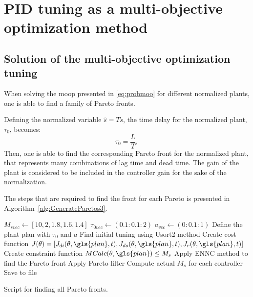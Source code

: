\chapter{PID tuning as a multi-objective optimization method}
\label{chap:PIDMOOP}

\section{Solution of the multi-objective optimization tuning}
\label{sec:SolMOOP}
When solving the \gls{moop} presented in \eqref{eq:probmoo} for different normalized plants, one is able to find a family of Pareto fronts.

Defining the normalized variable $\hat{s}=T s$, the time delay for the normalized plant, $\tau_0$, becomes:
\begin{equation}
\tau_0 = \frac{L}{T},
\label{eq:tauNorm}
\end{equation}
%
Then, one is able to find the corresponding Pareto front for the normalized plant, that represents many combinations of lag time and dead time. The gain of the plant is considered to be included in the controller gain for the sake of the normalization.

The steps that are required to find the front for each Pareto is presented in Algorithm~\ref{alg:GenerateParetos3}.
%
\begin{algorithm}[tb]
	\begin{algorithmic}
		\State $M_{svec} \gets [10,2,1.8,1.6,1.4]$
		\State $\tau_{0vec} \gets (0.1:0.1:2)$
		\State $a_{vec} \gets (0:0.1:1)$
			\State Define the plant \gls{plan} with $\tau_{0}$ and $a$
			\State Find initial tuning  using Usort2 method
			\State Create cost function $J(\theta) = [J_{di}(\theta, \gls{plan}, t),J_{do}(\theta, \gls{plan}, t),J_{r}(\theta, \gls{plan}, t) ]$
			\State Create constraint function $MCalc(\theta, \gls{plan}) \leq M_s$
			\State Apply ENNC method to find the Pareto front
			\State Apply Pareto filter
			\State Compute actual $M_s$ for each controller
			\State Save to file
		\EndFor
	\end{algorithmic}
\caption{Script for finding all Pareto fronts.}
\label{alg:GenerateParetos3}
\end{algorithm}
%

